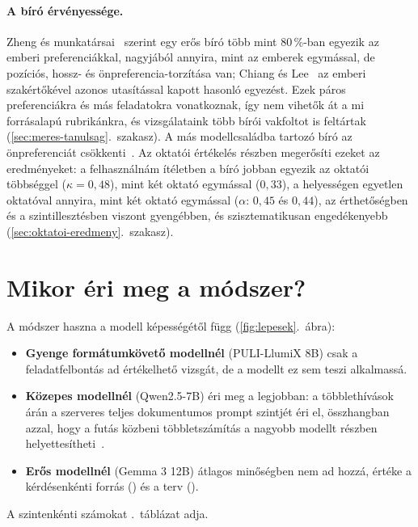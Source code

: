 \paragraph{A bíró érvényessége.} Zheng és munkatársai~\cite{zheng2023judge} szerint egy erős bíró több mint
80\,\%-ban egyezik az emberi preferenciákkal, nagyjából annyira, mint az emberek egymással, de pozíciós,
hossz- és önpreferencia-torzítása van; Chiang és Lee~\cite{chiang2023human} az emberi szakértőkével azonos
utasítással kapott hasonló egyezést. Ezek páros preferenciákra és más feladatokra vonatkoznak, így nem
vihetők át a mi forrásalapú rubrikánkra, és vizsgálataink több bírói vakfoltot is feltártak
(\ref{sec:meres-tanulsag}.~szakasz). A más modellcsaládba tartozó bíró az önpreferenciát
csökkenti~\cite{panickssery2024selfpref}. Az oktatói értékelés részben megerősíti ezeket az eredményeket: a
felhasználnám ítéletben a bíró jobban egyezik az oktatói többséggel ($\kappa=0{,}48$), mint két oktató
egymással ($0{,}33$), a helyességen egyetlen oktatóval annyira, mint két oktató egymással ($\alpha$: $0{,}45$
és $0{,}44$), az érthetőségben és a szintillesztésben viszont gyengébben, és szisztematikusan
engedékenyebb (\ref{sec:oktatoi-eredmeny}.~szakasz).

\section{Mikor éri meg a módszer?}
\label{sec:mikor}

A módszer haszna a modell képességétől függ (\ref{fig:lepesek}.~ábra):
\begin{itemize}[leftmargin=*,itemsep=1pt,topsep=2pt]
\item \textbf{Gyenge formátumkövető modellnél} (PULI-LlumiX 8B) csak a feladatfelbontás ad értékelhető vizsgát, de a modellt ez sem teszi alkalmassá.
\item \textbf{Közepes modellnél} (Qwen2.5-7B) éri meg a legjobban: a többlethívások árán a szerveres teljes dokumentumos prompt szintjét éri el, összhangban azzal, hogy a futás közbeni többletszámítás a nagyobb modellt részben helyettesítheti~\cite{snell2025scaling}.
\item \textbf{Erős modellnél} (Gemma 3 12B) átlagos minőségben nem ad hozzá, értéke a kérdésenkénti forrás () és a terv ().
\end{itemize}
A szintenkénti számokat \az{\ref{tab:dontes}}.~táblázat adja.

